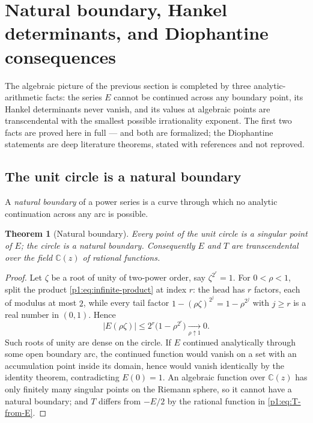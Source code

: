 \documentclass[11pt,oneside]{article}
\numberwithin{equation}{section}
\newtheorem{theorem}{Theorem}[section]
\theoremstyle{definition}
\theoremstyle{remark}
\newcommand{\C}{\mathbb C}
\begin{document}
\section[Natural boundary and Hankel rigidity]{Natural boundary, Hankel determinants, and Diophantine consequences}
\label{p1:sec:boundary-hankel}

The algebraic picture of the previous section is completed by three
analytic-arithmetic facts: the series \(E\) cannot be continued across any
boundary point, its Hankel determinants never vanish, and its values at
algebraic points are transcendental with the smallest possible irrationality
exponent.  The first two facts are proved here in full --- and both are
formalized; the Diophantine statements are deep literature theorems,
stated with references and not reproved.

\subsection{The unit circle is a natural boundary}

A \emph{natural boundary} of a power series is a curve through which no
analytic continuation across any arc is possible.

\begin{theorem}[Natural boundary]
\label{p1:thm:natural-boundary}
Every point of the unit circle is a singular point of \(E\); the circle is a
natural boundary.  Consequently \(E\) and \(T\) are transcendental over the
field \(\C(z)\) of rational functions.
\end{theorem}

\begin{proof}
Let \(\zeta\) be a root of unity of two-power order, say \(\zeta^{2^r}=1\).
For \(0<\rho<1\), split the product \eqref{p1:eq:infinite-product} at index
\(r\): the head has \(r\) factors, each of modulus at most \(2\), while every
tail factor \(1-(\rho\zeta)^{2^j}=1-\rho^{2^j}\) with \(j\ge r\) is a real
number in \((0,1)\).  Hence
\[
 |E(\rho\zeta)|\le2^r\bigl(1-\rho^{2^r}\bigr)
 \xrightarrow[\rho\uparrow1]{}0.
\]
Such roots of unity are dense on the circle.  If \(E\) continued
analytically through some open boundary arc, the continued function would
vanish on a set with an accumulation point inside its domain, hence would
vanish identically by the identity theorem, contradicting \(E(0)=1\).  An
algebraic function over \(\C(z)\) has only finitely many singular points on
the Riemann sphere, so it cannot have a natural boundary; and \(T\) differs
from \(-E/2\) by the rational function in \eqref{p1:eq:T-from-E}.
\end{proof}
\end{document}
